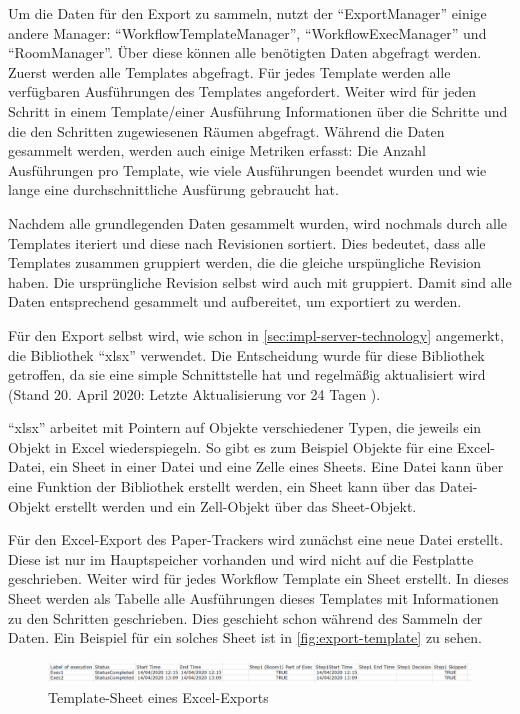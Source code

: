 Um die Daten für den Export zu sammeln, nutzt der \enquote{ExportManager} einige andere Manager:
\enquote{WorkflowTemplateManager}, \enquote{WorkflowExecManager} und \enquote{RoomManager}.
Über diese können alle benötigten Daten abgefragt werden.
Zuerst werden alle Templates abgefragt.
Für jedes Template werden alle verfügbaren Ausführungen des Templates angefordert.
Weiter wird für jeden Schritt in einem Template/einer Ausführung Informationen über die Schritte und die den Schritten
zugewiesenen Räumen abgefragt.
Während die Daten gesammelt werden, werden auch einige Metriken erfasst: Die Anzahl Ausführungen pro Template,
wie viele Ausführungen beendet wurden und wie lange eine durchschnittliche Ausfürung gebraucht hat.

Nachdem alle grundlegenden Daten gesammelt wurden, wird nochmals durch alle Templates iteriert und diese nach Revisionen sortiert.
Dies bedeutet, dass alle Templates zusammen gruppiert werden, die die gleiche urspüngliche Revision haben.
Die ursprüngliche Revision selbst wird auch mit gruppiert.
Damit sind alle Daten entsprechend gesammelt und aufbereitet, um exportiert zu werden.

Für den Export selbst wird, wie schon in \autoref{sec:impl-server-technology} angemerkt, die Bibliothek \enquote{xlsx} verwendet.
Die Entscheidung wurde für diese Bibliothek getroffen, da sie eine simple Schnittstelle hat und regelmäßig aktualisiert wird
(Stand 20. April 2020: Letzte Aktualisierung vor 24 Tagen \cite{tealeg2020}).

\enquote{xlsx} arbeitet mit Pointern auf Objekte verschiedener Typen, die jeweils ein Objekt in Excel wiederspiegeln.
So gibt es zum Beispiel Objekte für eine Excel-Datei, ein Sheet in einer Datei und eine Zelle eines Sheets.
Eine Datei kann über eine Funktion der Bibliothek erstellt werden, ein Sheet kann über das Datei-Objekt erstellt werden
und ein Zell-Objekt über das Sheet-Objekt.

Für den Excel-Export des Paper-Trackers wird zunächst eine neue Datei erstellt.
Diese ist nur im Hauptspeicher vorhanden und wird nicht auf die Festplatte geschrieben.
Weiter wird für jedes Workflow Template ein Sheet erstellt.
In dieses Sheet werden als Tabelle alle Ausführungen dieses Templates mit Informationen zu den Schritten geschrieben.
Dies geschieht schon während des Sammeln der Daten.
Ein Beispiel für ein solches Sheet ist in \autoref{fig:export-template} zu sehen.

\begin{figure}[htbp]
	\includegraphics[width=\textwidth]{images/export_template.png}
	\centering
	\caption{Template-Sheet eines Excel-Exports}
	\label{fig:export-template}
\end{figure}

